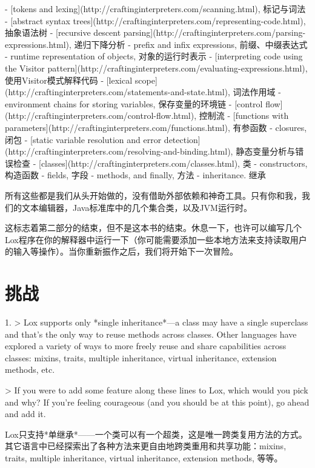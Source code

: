 \documentclass[cn,11pt,chinese]{elegantbook}
\begin{document}
- [tokens and lexing](http://craftinginterpreters.com/scanning.html),  标记与词法
- [abstract syntax trees](http://craftinginterpreters.com/representing-code.html),  抽象语法树
- [recursive descent parsing](http://craftinginterpreters.com/parsing-expressions.html),  递归下降分析
- prefix and infix expressions,  前缀、中缀表达式
- runtime representation of objects,  对象的运行时表示
- [interpreting code using the Visitor pattern](http://craftinginterpreters.com/evaluating-expressions.html), 使用Visitor模式解释代码
- [lexical scope](http://craftinginterpreters.com/statements-and-state.html),  词法作用域
- environment chains for storing variables,  保存变量的环境链
- [control flow](http://craftinginterpreters.com/control-flow.html), 控制流
- [functions with parameters](http://craftinginterpreters.com/functions.html), 有参函数
- closures, 闭包
- [static variable resolution and error detection](http://craftinginterpreters.com/resolving-and-binding.html), 静态变量分析与错误检查
- [classes](http://craftinginterpreters.com/classes.html), 类
- constructors, 构造函数
- fields, 字段
- methods, and finally,  方法
- inheritance.  继承

所有这些都是我们从头开始做的，没有借助外部依赖和神奇工具。只有你和我，我们的文本编辑器，Java标准库中的几个集合类，以及JVM运行时。

这标志着第二部分的结束，但不是这本书的结束。休息一下，也许可以编写几个Lox程序在你的解释器中运行一下（你可能需要添加一些本地方法来支持读取用户的输入等操作）。当你重新振作之后，我们将开始下一次冒险。

\section{挑战}

1. > Lox supports only *single inheritance*—a class may have a single superclass and that’s the only way to reuse methods across classes. Other languages have explored a variety of ways to more freely reuse and share capabilities across classes: mixins, traits, multiple inheritance, virtual inheritance, extension methods, etc.

   > If you were to add some feature along these lines to Lox, which would you pick and why? If you’re feeling courageous (and you should be at this point), go ahead and add it.

   Lox只支持*单继承*——一个类可以有一个超类，这是唯一跨类复用方法的方式。其它语言中已经探索出了各种方法来更自由地跨类重用和共享功能：mixins, traits, multiple inheritance, virtual inheritance, extension methods, 等等。
\end{document}
